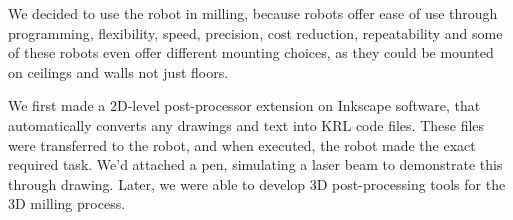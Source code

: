\bigskip
	

	
We decided to use the robot in milling, because robots offer ease of use through programming, flexibility, speed, precision, cost reduction, repeatability and some of these robots even offer different mounting choices, as they could be mounted on ceilings and walls not just floors.

We first made a 2D-level post-processor extension on Inkscape software, that automatically converts any drawings and text into KRL code files. These files were transferred to the robot, and when executed, the robot made the exact required task. We'd attached a pen, simulating a laser beam to demonstrate this through drawing. Later, we were able to develop 3D post-processing tools for the 3D milling process. 

	
	
	
	
